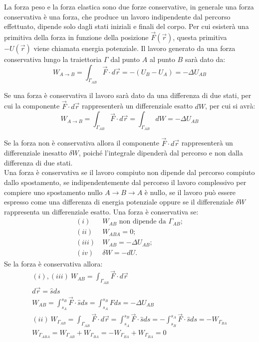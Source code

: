 \documentclass{article}
\numberwithin{equation}{subsection}
\begin{document}
La forza peso e la forza elastica sono due forze conservative, in 
generale una forza conservativa è una forza, che produce un lavoro 
indipendente dal percorso effettuato, dipende solo dagli stati iniziali 
e finali del corpo. Per cui esisterà una primitiva della forza in funzione della posizione $\vec{F}(\vec{r})$, questa primitiva $-U(\vec{r})$ 
viene chiamata energia potenziale. Il lavoro generato da una forza conservativa lungo 
la traiettoria $\Gamma$ dal punto $A$ al punto $B$ sarà dato da: 
\begin{equation}
    W_{A\to B}=\displaystyle\int_{\Gamma_{AB}}\vec{F}\cdot d\vec{r}=-\left(U_B-U_A\right)=-\Delta U_{AB}
\end{equation}

Se una forza è conservativa il lavoro sarà dato da una differenza di due stati, per cui la componente $\vec{F}\cdot d\vec{r}$ rappresenterà un differenziale esatto $dW$, per 
cui si avrà: 
\begin{equation}
    W_{A\to B}=\displaystyle\int_{\Gamma_{AB}}\vec{F}\cdot  d\vec{r}=\int_{\Gamma_{AB}}dW=-\Delta U_{AB}
\end{equation}

Se la forza non è conservativa allora il componente $\vec{F}\cdot d\vec{r}$ rappresenterà un differenziale inesatto $\delta W$, poiché l'integrale dipenderà dal percorso 
e non dalla differenza di due stati. 
\\
Una forza è conservativa se il lavoro compiuto non dipende dal percorso compiuto dallo spostamento, se indipendentemente dal percorso il lavoro complessivo per compiere uno 
spostamento nullo $A\to B\to A$ è nullo, se il lavoro può essere espresso come una differenza di energia potenziale oppure se il differenziale $\delta W$ rappresenta un 
differenziale esatto. 
Una forza è conservativa se:
\begin{align*}
    (i)\:& W_{AB} \mbox{ non dipende da }\Gamma_{AB};\\
    (ii)\:&W_{ABA}=0;\\
    (iii)\:& W_{AB}=-\Delta U_{AB};\\
    (iv)\:& \delta W =-dU.
\end{align*}
Se la forza è conservativa allora:
\begin{gather*}
    (i),(iii)\:W_{AB}=\displaystyle\int_{\Gamma_{AB}}\vec{F}\cdot d\vec{r}\\
    d\vec{r}=\hat{s}ds\\
    W_{AB}=\int_{s_A}^{s_B}\vec{F}\cdot\hat{s}ds=\int_{s_A}^{s_B}F ds=-\Delta U_{AB} \\
    (ii)\:W_{\Gamma_{AB}}=\displaystyle\int_{\Gamma_{AB}}\vec{F}\cdot d\vec{r}=\int_{s_A}^{s_B}\vec{F}\cdot\hat{s}ds=-\int_{s_B}^{s_A}\vec{F}\cdot\hat{s}ds=-W_{\Gamma_{BA}}\\
    W_{\Gamma_{ABA}}=W_{\Gamma_{AB}}+W_{\Gamma_{BA}}=-W_{\Gamma_{BA}}+W_{\Gamma_{BA}}=0
\end{gather*}
\end{document}
